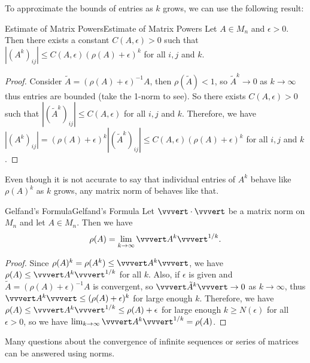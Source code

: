 \documentclass[../main.tex]{subfiles}
\begin{document}
To approximate the bounds of entries as $k$ grows, we can use the following result:
\begin{corollary}{Estimate of Matrix Powers}{Estimate of Matrix Powers}
  Let $A \in M_n$ and $\epsilon > 0$. Then there exists a constant $C(A, \epsilon) > 0$ such that $|(A^k)_{ij}| \leq C(A, \epsilon) (\rho(A) + \epsilon)^k$ for all $i,j$ and $k$.
\end{corollary}
\begin{proof}
  Consider $\tilde{A} = (\rho(A) + \epsilon)^{-1} A$, then $\rho(\tilde{A}) < 1$, so $\tilde{A}^k \to 0$ as $k \to \infty$ thus entries are bounded (take the 1-norm to see). So there exists $C(A, \epsilon) > 0$ such that $|(\tilde{A}^k)_{ij}| \leq C(A, \epsilon)$ for all $i,j$ and $k$. Therefore, we have $|(A^k)_{ij}| = (\rho(A) + \epsilon)^k |(\tilde{A}^k)_{ij}| \leq C(A, \epsilon) (\rho(A) + \epsilon)^k$ for all $i,j$ and $k$.
\end{proof}

Even though it is not accurate to say that individual entries of $A^k$ behave like $\rho(A)^k$ as $k$ grows, any matrix norm of behaves like that.

\begin{corollary}{Gelfand's Formula}{Gelfand's Formula}
  Let $\vvvert \cdot \vvvert$ be a matrix norm on $M_n$ and let $A \in M_n$. Then we have
  \begin{equation}
    \rho(A) = \lim_{k \to \infty} \vvvert A^k \vvvert^{1/k}.
  \end{equation}
\end{corollary}
\begin{proof}
  Since $\rho(A)^k = \rho(A^k) \leq \vvvert A^k \vvvert$, we have $\rho(A) \leq \vvvert A^k \vvvert^{1/k}$ for all $k$. Also, if $\epsilon$ is given and $\tilde{A} = (\rho(A) + \epsilon)^{-1} A$ is convergent, so $\vvvert \tilde{A}^k \vvvert \rightarrow 0$ as $k \to \infty$, thus $\vvvert A^k \vvvert \leq (\rho(A) + \epsilon)^k$ for large enough $k$. Therefore, we have $\rho(A) \leq \vvvert A^k \vvvert^{1/k} \leq \rho(A) + \epsilon$ for large enough $k \geq N(\epsilon)$ for all $\epsilon > 0$, so we have $\lim_{k \to \infty} \vvvert A^k \vvvert^{1/k} = \rho(A)$.
\end{proof}

\begin{remark}
  Many questions about the convergence of infinite sequences or series of matrices can be answered using norms.
\end{remark}
\end{document}
